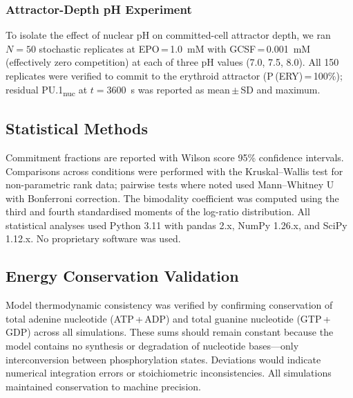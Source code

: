 \subsubsection*{Attractor-Depth pH Experiment}

To isolate the effect of nuclear pH on committed-cell attractor depth, we ran
$N=50$ stochastic replicates at EPO\,=\,1.0~mM with GCSF\,=\,0.001~mM (effectively
zero competition) at each of three pH values (7.0, 7.5, 8.0). All 150 replicates
were verified to commit to the erythroid attractor (P\,(ERY)\,=\,100\%);
residual PU.1\textsubscript{nuc} at $t=3600$~s was reported as mean\,$\pm$\,SD
and maximum.

\subsection{Statistical Methods}

Commitment fractions are reported with Wilson score 95\% confidence intervals.
Comparisons across conditions were performed with the Kruskal--Wallis test for
non-parametric rank data; pairwise tests where noted used Mann--Whitney U with
Bonferroni correction. The bimodality coefficient was computed using the
third and fourth standardised moments of the log-ratio distribution. All
statistical analyses used Python 3.11 with pandas 2.x, NumPy 1.26.x, and
SciPy 1.12.x. No proprietary software was used.

\subsection{Energy Conservation Validation}

Model thermodynamic consistency was verified by confirming conservation of total
adenine nucleotide (ATP\,+\,ADP) and total guanine nucleotide (GTP\,+\,GDP)
across all simulations. These sums should remain constant because the model
contains no synthesis or degradation of nucleotide bases---only interconversion
between phosphorylation states. Deviations would indicate numerical integration
errors or stoichiometric inconsistencies. All simulations maintained conservation
to machine precision.

